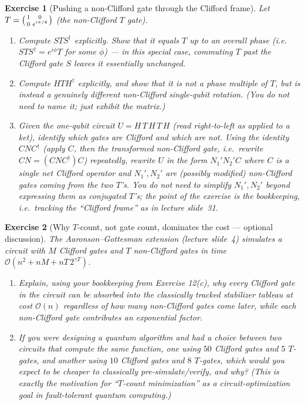 \documentclass[11pt]{article}
\newtheorem*{exercise}{Exercise}
\begin{document}
\begin{exercise}[Pushing a non-Clifford gate through the Clifford frame]
Let $T = \begin{psmallmatrix}1&0\\0&e^{i\pi/4}\end{psmallmatrix}$ (the
non-Clifford $T$ gate).
\begin{enumerate}[label=(\alph*)]
    \item Compute $STS^\dagger$ explicitly. Show that it equals $T$ up to
    an overall phase (i.e.\ $STS^\dagger = e^{i\phi}T$ for some $\phi$) ---
    in this special case, commuting $T$ past the Clifford gate $S$ leaves
    it essentially unchanged.
    \item Compute $HTH^\dagger$ explicitly, and show that it is \emph{not}
    a phase multiple of $T$, but is instead a genuinely different
    non-Clifford single-qubit rotation. (You do not need to name it; just
    exhibit the matrix.)
    \item Given the one-qubit circuit $U = H\, T\, H\, T\, H$ (read
    right-to-left as applied to a ket), identify which gates are Clifford
    and which are not. Using the identity $C N C^\dagger$ (apply $C$, then
    the transformed non-Clifford gate, i.e.\ rewrite $CN = (CNC^\dagger)C$)
    repeatedly, rewrite $U$ in the form $N_1' N_2' C$ where $C$ is a single
    net Clifford operator and $N_1', N_2'$ are (possibly modified)
    non-Clifford gates coming from the two $T$'s. You do not need to
    simplify $N_1', N_2'$ beyond expressing them as conjugated $T$'s; the
    point of the exercise is the bookkeeping, i.e.\ tracking the ``Clifford
    frame'' as in lecture slide~31.
\end{enumerate}
\end{exercise}

\begin{exercise}[Why $T$-count, not gate count, dominates the cost --- optional discussion]
The Aaronson--Gottesman extension (lecture slide~4) simulates a circuit
with $M$ Clifford gates and $T$ non-Clifford gates in time
$\mathcal{O}(n^2 + nM + nT\,2^{\gamma T})$.
\begin{enumerate}[label=(\alph*)]
    \item Explain, using your bookkeeping from Exercise 12(c), why every
    Clifford gate in the circuit can be absorbed into the classically
    tracked stabilizer tableau at cost $\mathcal{O}(n)$ regardless of how
    many non-Clifford gates come later, while each non-Clifford gate
    contributes an exponential factor.
    \item If you were designing a quantum algorithm and had a choice
    between two circuits that compute the same function, one using $50$
    Clifford gates and $5$ $T$-gates, and another using $10$ Clifford gates
    and $8$ $T$-gates, which would you expect to be cheaper to
    \emph{classically pre-simulate/verify}, and why? (This is exactly the
    motivation for ``$T$-count minimization'' as a circuit-optimization
    goal in fault-tolerant quantum computing.)
\end{enumerate}
\end{exercise}
\end{document}
